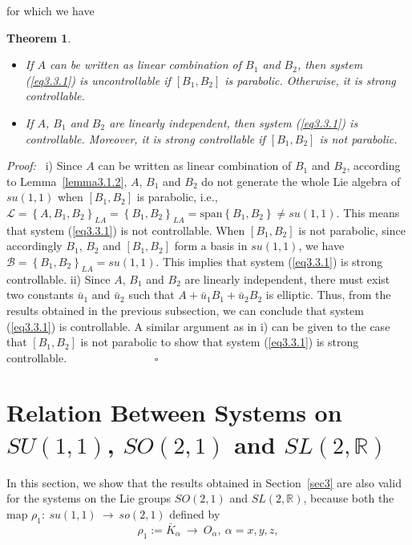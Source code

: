 \documentclass[onecolumn,showpacs,showkeys,preprintnumbers]{revtex4}
\newtheorem{theorem}{Theorem}[section]
\begin{document}
\noindent for which we have
\noindent\begin{theorem}\label{theorem8.1}\noindent\begin{itemize}
    \item[i)] If $A$ can be written as linear combination of $B_1$ and
$B_2$, then system (\ref{eq3.3.1}) is uncontrollable if
$[B_1,B_2]$ is parabolic. Otherwise, it is strong controllable.
    \item[ii)] If $A$, $B_1$ and $B_2$ are linearly independent, then
system (\ref{eq3.3.1}) is controllable. Moreover, it is strong
controllable if $[B_1,B_2]$ is not parabolic.
\end{itemize}
\end{theorem}
{\it{Proof:~}} i) Since $A$ can be written as linear combination
of $B_1$ and $B_2$, according to Lemma~\ref{lemma3.1.2}, $A$,
$B_1$ and $B_2$ do not generate the whole Lie algebra of $su(1,1)$
when $[B_1,B_2]$ is parabolic, i.e.,
$\mathcal{L}=\left\{A,B_1,B_2\right\}_{LA}=\left\{B_1,B_2\right\}_{LA}=\text{span}\left\{B_1,B_2\right\}{\neq}su(1,1)$.
This means that system (\ref{eq3.3.1}) is not controllable. When
$[B_1,B_2]$ is not parabolic, since accordingly $B_1$, $B_2$ and
$[B_1,B_2]$ form a basis in $su(1,1)$, we have
$\mathcal{B}=\left\{B_1,B_2\right\}_{LA}=su(1,1)$. This implies
that system (\ref{eq3.3.1}) is strong controllable. ii) Since $A$,
$B_1$ and $B_2$ are linearly independent, there must exist two
constants $\bar{u}_1$ and $\bar{u}_2$ such that
$A+\bar{u}_1B_1+\bar{u}_2B_2$ is elliptic. Thus, from the results
obtained in the previous subsection, we can conclude that system
(\ref{eq3.3.1}) is controllable. A similar argument as in i) can
be given to the case that $[B_1,B_2]$ is not parabolic to show
that system (\ref{eq3.3.1}) is strong controllable.
~~~~~~~~~~~~~~~$\square$

\section{Relation Between Systems on $SU(1,1)$, $SO(2,1)$ and $SL(2,\mathbb{R})$}\label{sec4}

In this section, we show that the results obtained in
Section~\ref{sec3} are also valid for the systems on the Lie
groups $SO(2,1)$ and $SL(2,\mathbb{R})$, because both the map
$\rho_1:~su(1,1)~\rightarrow~so(2,1)$ defined by\noindent\begin{equation}\label{eq4.1}\rho_1:=\bar{K}_\alpha~\rightarrow~O_\alpha,~\alpha=x,y,z,
\end{equation}
\end{document}

